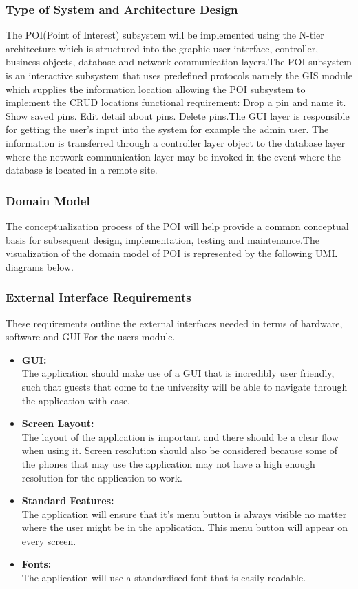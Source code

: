 \documentclass{article}
\begin{document}
 		\subsubsection{Type of System and Architecture Design}
The POI(Point of Interest) subsystem will be implemented using the N-tier architecture which is structured into the graphic user interface, controller, business objects, database and network communication layers.The POI subsystem is an interactive subsystem that uses predeﬁned protocols namely the GIS module which supplies the information location allowing the POI subsystem to implement the CRUD locations functional requirement: Drop a pin and name it. Show saved pins. Edit detail about pins. Delete pins.The GUI layer is responsible for getting the user’s input into the system for example the admin user. The information is transferred through a controller layer object to the database layer where the network communication layer may be invoked in the event where the database is located in a remote site.

		\subsubsection{Domain Model }
The conceptualization process of the POI will help provide a common conceptual basis for subsequent design, implementation, testing and maintenance.The visualization of the domain model of POI is represented by the following UML diagrams below.

\subsubsection{External Interface Requirements}
These requirements outline the external interfaces needed in terms of hardware, software and GUI For the users module.

\begin{itemize}	 		
	\item \textbf{GUI:}
	\\The application should make use of a GUI that is incredibly user friendly, such that guests that come to the university will be able to navigate through the application with ease.
	
	\item \textbf{Screen Layout:}
	\\The layout of the application is important and there should be a clear flow when using it. Screen resolution should also be considered because some of the phones that may use the application may not have a high enough resolution for the application to work.
	
	\item \textbf{Standard Features:}
	\\The application will ensure that it's menu button is always visible no matter where the user might be in the application. This menu button will appear on every screen.
	
	\item \textbf{Fonts:}
	\\The application will use a standardised font that is easily readable.
\end{itemize}
\end{document}
